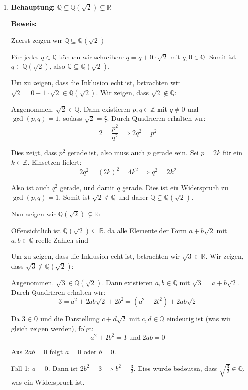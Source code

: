 \documentclass{article}
\newcommand{\Q}{\mathbb{Q}}
\newcommand{\R}{\mathbb{R}}
\newcommand{\adjunction}[2]{#1(#2)}
\begin{document}
\begin{enumerate}
\item \textbf{Behauptung:} \( \Q \subsetneq \adjunction{\Q}{\sqrt 2} \subsetneq \R\)

\textbf{Beweis:}

Zuerst zeigen wir \(\Q \subseteq \adjunction{\Q}{\sqrt 2}\):

Für jedes \(q \in \Q\) können wir schreiben: \(q = q + 0 \cdot \sqrt{2}\) mit \(q, 0 \in \Q\).
Somit ist \(q \in \adjunction{\Q}{\sqrt 2}\), also \(\Q \subseteq \adjunction{\Q}{\sqrt 2}\).

Um zu zeigen, dass die Inklusion echt ist, betrachten wir \(\sqrt{2} = 0 + 1 \cdot \sqrt{2} \in \adjunction{\Q}{\sqrt 2}\).
Wir zeigen, dass \(\sqrt{2} \notin \Q\):

Angenommen, \(\sqrt{2} \in \Q\). Dann existieren \(p, q \in \mathbb{Z}\) mit \(q \neq 0\) und \(\gcd(p,q) = 1\), sodass \(\sqrt{2} = \frac{p}{q}\).
Durch Quadrieren erhalten wir:
\[2 = \frac{p^2}{q^2} \implies 2q^2 = p^2\]

Dies zeigt, dass \(p^2\) gerade ist, also muss auch \(p\) gerade sein. Sei \(p = 2k\) für ein \(k \in \mathbb{Z}\).
Einsetzen liefert:
\[2q^2 = (2k)^2 = 4k^2 \implies q^2 = 2k^2\]

Also ist auch \(q^2\) gerade, und damit \(q\) gerade. Dies ist ein Widerspruch zu \(\gcd(p,q) = 1\).
Somit ist \(\sqrt{2} \notin \Q\) und daher \(\Q \subsetneq \adjunction{\Q}{\sqrt 2}\).

Nun zeigen wir \(\adjunction{\Q}{\sqrt 2} \subsetneq \R\):

Offensichtlich ist \(\adjunction{\Q}{\sqrt 2} \subseteq \R\), da alle Elemente der Form \(a + b\sqrt{2}\) mit \(a,b \in \Q\) reelle Zahlen sind.

Um zu zeigen, dass die Inklusion echt ist, betrachten wir \(\sqrt{3} \in \R\).
Wir zeigen, dass \(\sqrt{3} \notin \adjunction{\Q}{\sqrt 2}\):

Angenommen, \(\sqrt{3} \in \adjunction{\Q}{\sqrt 2}\). Dann existieren \(a, b \in \Q\) mit \(\sqrt{3} = a + b\sqrt{2}\).
Durch Quadrieren erhalten wir:
\[3 = a^2 + 2ab\sqrt{2} + 2b^2 = (a^2 + 2b^2) + 2ab\sqrt{2}\]

Da \(3 \in \Q\) und die Darstellung \(c + d\sqrt{2}\) mit \(c, d \in \Q\) eindeutig ist (was wir gleich zeigen werden), folgt:
\[a^2 + 2b^2 = 3 \text{ und } 2ab = 0\]

Aus \(2ab = 0\) folgt \(a = 0\) oder \(b = 0\).

Fall 1: \(a = 0\). Dann ist \(2b^2 = 3 \implies b^2 = \frac{3}{2}\).
Dies würde bedeuten, dass \(\sqrt{\frac{3}{2}} \in \Q\), was ein Widerspruch ist.


\end{enumerate}
\end{document}
